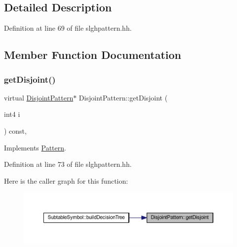 \subsection{Detailed Description}


Definition at line 69 of file slghpattern.\+hh.



\subsection{Member Function Documentation}
\mbox{\label{class_disjoint_pattern_a4d5e45112cf698f36a5de3654efd6761}} 
\subsubsection{\texorpdfstring{getDisjoint()}{getDisjoint()}}
{\footnotesize\ttfamily virtual \mbox{\hyperlink{class_disjoint_pattern}{Disjoint\+Pattern}}$\ast$ Disjoint\+Pattern\+::get\+Disjoint (\begin{DoxyParamCaption}\item[{int4}]{i }\end{DoxyParamCaption}) const\hspace{0.3cm}{\ttfamily [inline]}, {\ttfamily [virtual]}}



Implements \mbox{\hyperlink{class_pattern_a0404a3a426d9ed2afddde9c9c67f2f14}{Pattern}}.



Definition at line 73 of file slghpattern.\+hh.

Here is the caller graph for this function\+:
\nopagebreak
\begin{figure}[H]
\begin{center}
\leavevmode
\includegraphics[width=350pt]{class_disjoint_pattern_a4d5e45112cf698f36a5de3654efd6761_icgraph}
\end{center}
\end{figure}
\mbox{\label{class_disjoint_pattern_a639b88b6ca8eeb7c74562fded205c601}} 
